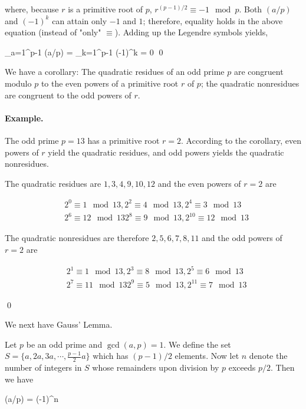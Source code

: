 where, because $r$ is a primitive root of $p$, $r^{(p-1)/2} \equiv -1 \mod p$. Both $(a/p)$ and $(-1)^k$ can attain only $-1$ and $1$; therefore, equality holds in the above equation (instead of "only" $\equiv$). Adding up the Legendre symbols yields,

\bee
\sum_{a=1}^{p-1} (a/p) = \sum_{k=1}^{p-1} (-1)^k = 0 \qed
\eee

We have a corollary: The quadratic residues of an odd prime $p$ are congruent modulo $p$ to the even powers of a primitive root $r$ of $p$; the quadratic nonresidues are congruent to the odd powers of $r$.

\paragraph{Example.} The odd prime $p=13$ has a primitive root $r=2$. According to the corollary, even powers of $r$ yield the quadratic residues, and odd powers yields the quadratic nonresidues.

The quadratic residues are $1, 3, 4, 9, 10, 12$ and the even powers of $r=2$ are

\begin{align*}
& 2^0 \equiv 1 \mod 13, 2^2 \equiv 4 \mod 13, 2^4 \equiv 3 \mod 13 \\
& 2^6 \equiv 12 \mod 13 2^8 \equiv 9 \mod 13, 2^{10} \equiv 12 \mod 13
\end{align*}

The quadratic nonresidues are therefore $2, 5, 6, 7, 8, 11$ and the odd powers of $r=2$ are

\begin{align*}
& 2^1 \equiv 1 \mod 13, 2^3 \equiv 8 \mod 13, 2^5 \equiv 6 \mod 13 \\
& 2^7 \equiv 11 \mod 13 2^9 \equiv 5 \mod 13, 2^{11} \equiv 7 \mod 13
\end{align*}

\qed

We next have Gauss' Lemma.

\begin{theorem}
	\label{2023-02-13:th4}
Let $p$ be an odd prime and $\gcd(a,p)=1$. We define the set $S = \{a, 2a, 3a, \cdots, \frac{p-1}{2}a \}$ which has $(p-1)/2$ elements. Now let $n$ denote the number of integers in $S$ whose remainders upon division by $p$ exceeds $p/2$. Then we have

\bee
(a/p) = (-1)^n
\eee

\end{theorem}

